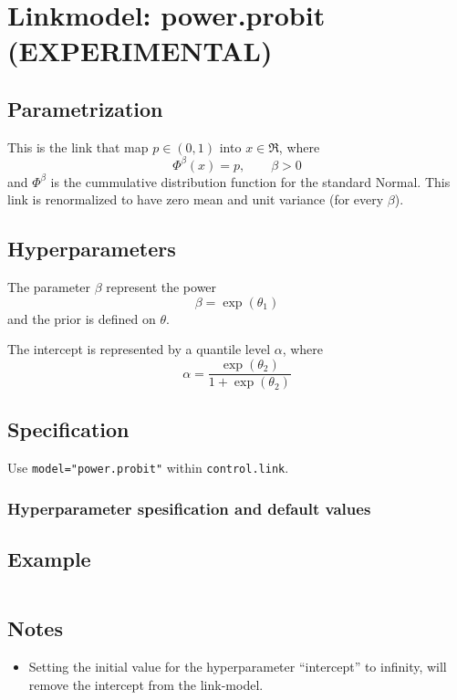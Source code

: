 \documentclass[a4paper,11pt]{article}
\begin{document}
\section*{Linkmodel: power.probit (EXPERIMENTAL)}

\subsection*{Parametrization}

This is the link that map $p\in (0,1)$ into $x\in\Re$, where
\begin{displaymath}
    \Phi^{\beta}(x) = p, \qquad \beta > 0
\end{displaymath}
and $\Phi^{\beta}$ is the cummulative distribution function for the
standard Normal. This link is renormalized to have zero mean and unit
variance (for every $\beta$).

\subsection*{Hyperparameters}

The parameter $\beta$ represent the power
\begin{displaymath}
    \beta = \exp(\theta_1)
\end{displaymath}
and the prior is defined on $\theta$. 

The intercept is represented by a quantile level $\alpha$, where
\begin{displaymath}
    \alpha = \frac{\exp(\theta_2)}{1 + \exp(\theta_2)}
\end{displaymath}

\subsection*{Specification}

Use \texttt{model="power.probit"} within \texttt{control.link}.  

\subsubsection*{Hyperparameter spesification and default values}


\subsection*{Example}

\begin{verbatim}
\end{verbatim}

\subsection*{Notes}

\begin{itemize}
\item Setting the initial value for the hyperparameter ``intercept''
    to infinity, will remove the intercept from the link-model.
\end{itemize}
\end{document}
